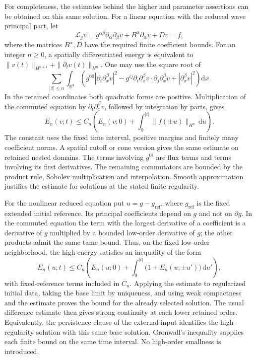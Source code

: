 \documentclass[
  english,
  11pt,
  reqno]{amsart}
\begin{document}
For completeness, the estimates behind the higher and parameter
assertions can be obtained on this same solution. For a linear equation
with the reduced wave principal part, let%
 \[
\mathcal L_g v
=g^{\alpha\beta}\partial_\alpha\partial_\beta v
+B^\alpha\partial_\alpha v+Dv=f,
\] where the matrices \(B^\alpha,D\) have the required finite
coefficient bounds. For an integer \(n\ge0\), a spatially differentiated
energy is equivalent to \(\|v(t)\|_{H^{n+1}}+\|\partial_tv(t)\|_{H^n}\).
One may use the square root of%
 \[
\sum_{|\beta|\le n}\int_{\mathbb R^3}
\left(
g^{00}|\partial_t\partial_x^\beta v|^2
-g^{ij}\partial_i\partial_x^\beta v\cdot
          \partial_j\partial_x^\beta v
+|\partial_x^\beta v|^2
\right)\mathrm dx.
\] In the retained coordinates both quadratic forms are positive.
Multiplication of the commuted equation by
\(\partial_t\partial_x^\beta v\), followed by integration by parts,
gives%
 \[
E_n(v;t)\le
C_n\left(
E_n(v;0)+\int_0^{|t|}
\|f(\pm u)\|_{H^n}\,\mathrm du
\right).
\] The constant uses the fixed time interval, positive margins and
finitely many coefficient norms. A spatial cutoff or cone version gives
the same estimate on retained nested domains. The terms involving
\(g^{0i}\) are flux terms and terms involving its first derivatives. The
remaining commutators are bounded by the product rule, Sobolev
multiplication and interpolation. Smooth approximation justifies the
estimate for solutions at the stated finite regularity.

For the nonlinear reduced equation put \(u=g-g_{\mathrm{ref}}\), where
\(g_{\mathrm{ref}}\) is the fixed extended initial reference. Its
principal coefficients depend on \(g\) and not on \(\partial g\). In the
commuted equation the term with the largest derivative of a coefficient
is a derivative of \(g\) multiplied by a bounded low-order derivative of
\(g\); the other products admit the same tame bound. Thus, on the fixed
low-order neighborhood, the high energy satisfies an inequality of the
form%
 \[
E_n(u;t)\le
C_n\left(E_n(u;0)+
\int_0^{|t|}\bigl(1+E_n(u;\pm u')\bigr)\,\mathrm du'\right),
\] with fixed-reference terms included in \(C_n\). Applying the estimate
to regularized initial data, taking the base limit by uniqueness, and
using weak compactness and the estimate proves the bound for the already
selected solution. The usual difference estimate then gives strong
continuity at each lower retained order. Equivalently, the persistence
clause of the external input identifies the high-regularity solution
with this same base solution. Gronwall's inequality supplies each finite
bound on the same time interval. No high-order smallness is introduced.
\end{document}
